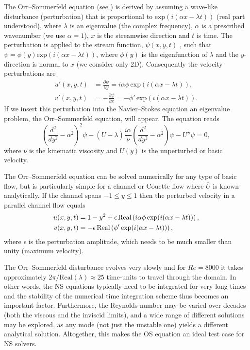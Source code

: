The Orr--Sommerfeld equation (see \citet{Orzag1971}) is
derived by assuming a wave-like disturbance (perturbation) that is
proportional to $\text{exp}(i(\alpha x-\lambda t))$ (real part
understood), where $\lambda$ is an eigenvalue (the complex frequency),
$\alpha$ is a prescribed wavenumber (we use $\alpha=1$), $x$ is the
streamwise direction and $t$ is time. The perturbation is applied to
the stream function, $\psi(x,y,t)$ , such that $\psi=\phi(y)
\text{exp}(i(\alpha x- \lambda t))$, where $\phi(y)$ is the
eigenfunction of $\lambda$ and the $y$-direction is normal to $x$ (we
consider only 2D). Consequently the velocity perturbations are
\begin{align}
 u'(x,y,t)&=\frac{\partial \psi}{\partial y}=i\alpha \phi \, \text{exp}(i(\alpha x- \lambda t)),\\
 v'(x,y,t)&=-\frac{\partial \psi}{\partial x}=-\phi' \, \text{exp}(i(\alpha x- \lambda t)).
\end{align}
If we insert this perturbation into the Navier--Stokes equation an
eigenvalue problem, the Orr--Sommerfeld equation, will appear. The
equation reads
\begin{equation}
 \left( \frac{d^2}{dy^2}-\alpha^2\right)^2\psi - \left(\overline{U}-\lambda \right) \frac{i \alpha}{\nu} \left( \frac{d^2}{dy^2}-\alpha^2\right)\psi - \overline{U}''\psi=0,
 \label{eq:mortensen:OrrS}
\end{equation}
where $\nu$ is the kinematic viscosity and $\overline{U}(y)$ is the unperturbed or basic velocity.

The Orr--Sommerfeld equation can be solved numerically for any type of
basic flow, but is particularly simple for a channel or Couette flow
where $\overline{U}$ is known analytically. If the channel spans
$-1\leqslant y \leqslant 1$ then the perturbed velocity in a parallel channel
flow equals
\begin{align}
 u(x,y,t)&=1-y^2+\epsilon \,\text{Real}\left(i\alpha \phi \, \text{exp}(i(\alpha x-\lambda t))\right), \notag \\
 v(x,y,t)&=-\epsilon \, \text{Real}\left(\phi' \, \text{exp}(i(\alpha x-\lambda t))\right),
\label{eq:mortensen:channel}
\end{align}
where $\epsilon$ is the perturbation amplitude, which needs to be much smaller than unity (maximum velocity).

The Orr--Sommerfeld disturbance evolves very slowly and for $Re=8000$
it takes approximately $2 \pi/\text{Real}(\lambda)\approx 25$
time-units to travel through the domain. In other words, the NS
equations typically need to be integrated for very long times and the
stability of the numerical time integration scheme thus becomes an
important factor. Furthermore, the Reynolds number may be varied over
decades (both the viscous and the inviscid limits), and a wide range
of different solutions may be explored, as any mode (not just the
unstable one) yields a different analytical solution. Altogether,
this makes the OS equation an ideal test case for NS solvers.

